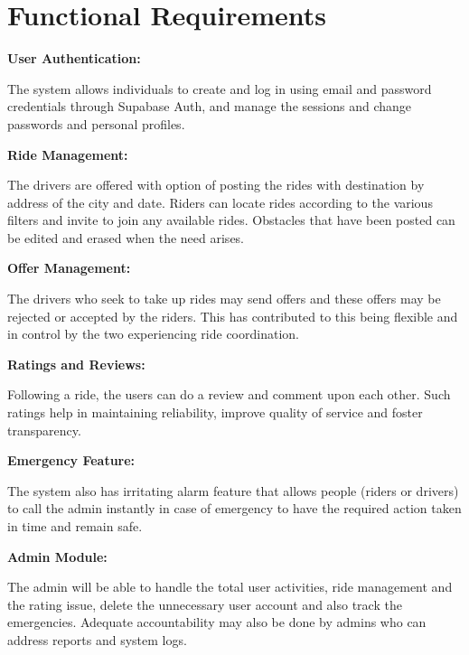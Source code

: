 \section{Functional Requirements}

\textbf{User Authentication: }
\begin{enumerate}[label=\roman*.]
 The system allows individuals to create and log in using email and password credentials through Supabase Auth, and manage the sessions and change passwords and personal profiles. 
    
\end{enumerate}

\textbf{Ride Management: }
\begin{enumerate}[label=\roman*.]
The drivers are offered with option of posting the rides with destination by address of the city and date. Riders can locate rides according to the various filters and invite to join any available rides. Obstacles that have been posted can be edited and erased when the need arises. 
    
\end{enumerate}

\textbf{Offer Management: }
\begin{enumerate}[label=\roman*.]
The drivers who seek to take up rides may send offers and these offers may be rejected or accepted by the riders. This has contributed to this being flexible and in control by the two experiencing ride coordination. 
\end{enumerate}

\textbf{Ratings and Reviews: }
\begin{enumerate}[label=\roman*.]
Following a ride, the users can do a review and comment upon each other. Such ratings help in maintaining reliability, improve quality of service and foster transparency. 
\end{enumerate}

\textbf{Emergency Feature: }
\begin{enumerate}[label=\roman*.]
The system also has irritating alarm feature that allows people (riders or drivers) to call the admin instantly in case of emergency to have the required action taken in time and remain safe. 
\end{enumerate}
\textbf{Admin Module:  }
\begin{enumerate}[label=\roman*.]
The admin will be able to handle the total user activities, ride management and the rating issue, delete the unnecessary user account and also track the emergencies. Adequate accountability may also be done by admins who can address reports and system logs.  
\end{enumerate}


